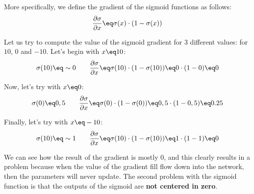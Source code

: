 \begin{center}
\end{center}

More specifically, we define the gradient of the sigmoid functions as follows:
\[ \frac{\partial \sigma}{\partial x} \eq \sigma(x) \cdot (1 - \sigma(x)) \]

Let us try to compute the value of the sigmoid gradient for 3 different values: for $10$, $0$ and $-10$. Let's begin with $x \eq 10$:
\[ \sigma(10) \eq \sim 0 \quad \quad \frac{\partial \sigma}{\partial x} \eq \sigma(10) \cdot (1 - \sigma(10)) \eq 0 \cdot (1 - 0) \eq 0 \]

Now, let's try with $x \eq 0$:
\[ \sigma(0) \eq 0,5 \quad \quad \frac{\partial \sigma}{\partial x} \eq \sigma(0) \cdot (1 - \sigma(0)) \eq 0,5 \cdot (1 - 0,5) \eq 0.25 \]

Finally, let's try with $x \eq -10$:
\[ \sigma(10) \eq \sim 1 \quad \quad \frac{\partial \sigma}{\partial x} \eq \sigma(10) \cdot (1 - \sigma(10)) \eq 1 \cdot (1 - 1) \eq 0 \]

We can see how the result of the gradient is mostly 0, and this clearly results in a problem because when the value of the gradient fill flow down into the network, then the parameters will never update.
\nl
The second problem with the sigmoid function is that the outputs of the sigmoid are \textbf{not centered in zero}.

